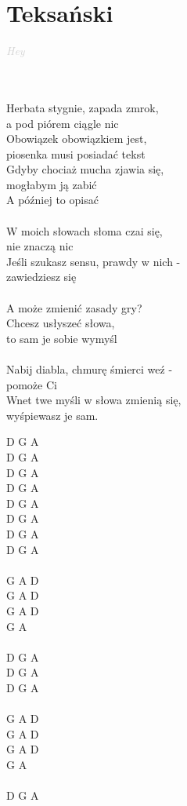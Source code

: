 \documentclass[a5paper, 10pt]{book}
\begin{document}
\section{Teksański}\textcolor{lightgray}{\textit{Hey}}\\~\\
\begin{minipage}[t]{0.7\textwidth}
~\\ %
Herbata stygnie, zapada zmrok,\\
a pod piórem ciągle nic\\
Obowiązek obowiązkiem jest,\\
piosenka musi posiadać tekst\\
Gdyby chociaż mucha zjawia się,\\
mogłabym ją zabić\\
A później to opisać\\
\\
W moich słowach słoma czai się,\\
nie znaczą nic\\
Jeśli szukasz sensu, prawdy w nich -\\
zawiedziesz się\\
\\
A może zmienić zasady gry?\\
Chcesz usłyszeć słowa,\\
to sam je sobie wymyśl\\
\\
Nabij diabla, chmurę śmierci weź -\\
pomoże Ci \\
Wnet twe myśli w słowa zmienią się,\\
wyśpiewasz je sam.\\

\end{minipage}
\begin{minipage}[t]{0.3\textwidth}
D G A   \\ %
D G A \\
D G A \\
D G A \\
D G A \\
D G A \\
D G A \\
D G A \\
\\
G A D \\
G A D \\
G A D \\
G A \\
\\
D G A \\
D G A \\
D G A \\
\\
G A D \\
G A D \\
G A D \\
G A \\
\\
D G A \\

\end{minipage}
\end{document}
